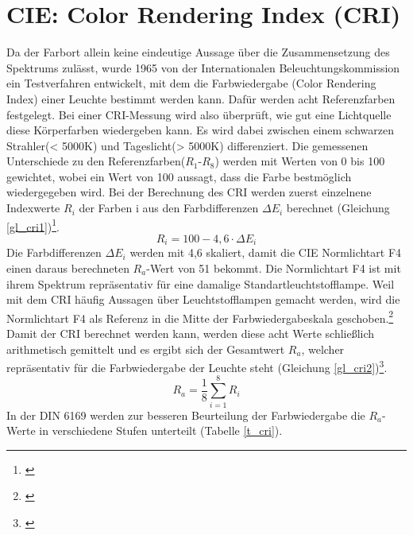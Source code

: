 \section{CIE: Color Rendering Index (CRI)} \label{sec_cri}
Da der Farbort allein keine eindeutige Aussage über die Zusammensetzung des Spektrums zulässt, wurde 1965 von der Internationalen Beleuchtungskommission ein Testverfahren entwickelt, mit dem die Farbwiedergabe (Color Rendering Index) einer Leuchte bestimmt werden kann. Dafür werden acht Referenzfarben festgelegt. Bei einer CRI-Messung wird also überprüft, wie gut eine Lichtquelle diese Körperfarben wiedergeben kann. Es wird dabei zwischen einem schwarzen Strahler(< 5000K) und Tageslicht(> 5000K) differenziert. Die gemessenen Unterschiede zu den Referenzfarben($R_{1}$-$R_{8}$) werden mit Werten von 0 bis 100 gewichtet, wobei ein Wert von 100 aussagt, dass die Farbe bestmöglich wiedergegeben wird. Bei der Berechnung des CRI werden zuerst einzelnene Indexwerte $R_{i}$ der Farben i aus den Farbdifferenzen $\Delta E_{i}$ berechnet (Gleichung \ref{gl_cri1})\footnote{\cite{davis_ohno}}.
	\begin{equation}\label{gl_cri1}
		R_{i} = 100 - 4,6 \cdot \Delta E_{i}
	\end{equation}
Die Farbdifferenzen $\Delta E_{i}$ werden mit 4,6 skaliert, damit die CIE Normlichtart F4 einen daraus berechneten $R_{a}$-Wert von 51 bekommt. Die Normlichtart F4 ist mit ihrem Spektrum repräsentativ für eine damalige  Standartleuchtstofflampe. Weil mit dem CRI häufig Aussagen über Leuchtstofflampen gemacht werden, wird die Normlichtart F4 als Referenz in die Mitte der Farbwiedergabeskala geschoben.\footnote{\cite{housmoss}}\\
Damit der CRI berechnet werden kann, werden diese acht Werte  schließlich arithmetisch gemittelt und es ergibt sich der Gesamtwert $R_{a}$,  welcher repräsentativ für die Farbwiedergabe der Leuchte steht (Gleichung \ref{gl_cri2})\footnote{\cite{production partner}}.
	\begin{equation}\label{gl_cri2}
		R_{a} =\frac{1}{8} \sum_{i=1}^{8} R_{i}
	\end{equation}
In der DIN 6169 werden zur besseren Beurteilung der Farbwiedergabe die $R_{a}$-Werte in verschiedene Stufen unterteilt (Tabelle \ref{t_cri}).

